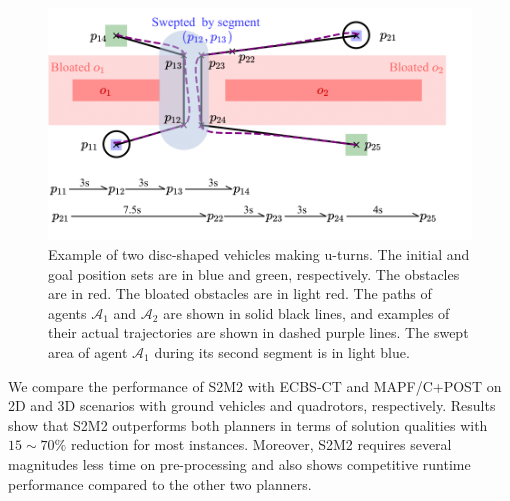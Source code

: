 \documentclass[letterpaper]{article} %
\theoremstyle{definition}
\begin{document}
\begin{figure}[t]
    \vspace{4pt}
    \centering
    \includegraphics[width=0.99\columnwidth]{uturn.png}
    \caption{Example of two disc-shaped vehicles making u-turns. The initial and goal position sets are in blue and green, respectively. The obstacles are in red. The bloated obstacles are in light red. The paths of agents $\mathcal{A}_1$ and $\mathcal{A}_2$ are shown in solid black lines, and examples of their actual trajectories are shown in dashed purple lines. The swept area of agent $\mathcal{A}_1$ during its second segment is in light blue.}
    \label{fig:uturn}
\end{figure}

We compare the performance of S2M2 with ECBS-CT \cite{cohen2019optimal} and MAPF/C+POST \cite{honig2018trajectory} on 2D and 3D scenarios with ground vehicles and quadrotors, respectively. Results show that S2M2 outperforms both planners in terms of solution qualities with $15\sim70\%$ reduction for most instances. Moreover, S2M2 requires several magnitudes less time on pre-processing and also shows competitive runtime performance compared to the other two planners. 

\end{document}
